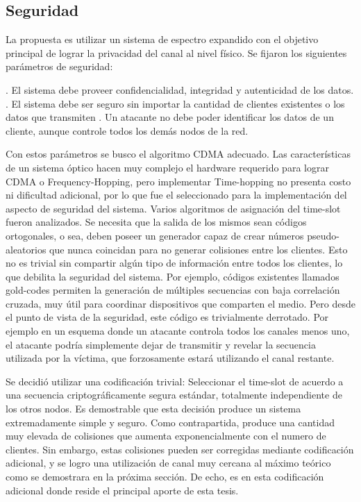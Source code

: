\subsection{Seguridad}
\label{Seguridad}
La propuesta es utilizar un sistema de espectro expandido con el objetivo principal de lograr la privacidad del canal al nivel físico.
Se fijaron los siguientes parámetros de seguridad:

. El sistema debe proveer confidencialidad, integridad y autenticidad de los datos.
. El sistema debe ser seguro sin importar la cantidad de clientes existentes o los datos que transmiten
. Un atacante no debe poder identificar los datos de un cliente, aunque controle todos los demás nodos de la red.

Con estos parámetros se busco el algoritmo CDMA adecuado. Las características de un sistema óptico hacen muy complejo el hardware requerido para lograr CDMA o Frequency-Hopping, pero implementar Time-hopping no presenta costo ni dificultad adicional, por lo que fue el seleccionado para la implementación del aspecto de seguridad del sistema.
Varios algoritmos de asignación del time-slot fueron analizados. Se necesita que la salida de los mismos sean códigos ortogonales, o sea, deben poseer un generador capaz de crear números pseudo-aleatorios que nunca coincidan para no generar colisiones entre los clientes. Esto no es trivial sin compartir algún tipo de información entre todos los clientes, lo que debilita la seguridad del sistema. Por ejemplo, códigos existentes llamados gold-codes permiten la generación de múltiples secuencias con baja correlación cruzada, muy útil para coordinar dispositivos que comparten el medio. Pero desde el punto de vista de la seguridad, este código es trivialmente derrotado. Por ejemplo en un esquema donde un atacante controla todos los canales menos uno, el atacante podría simplemente dejar de transmitir y revelar la secuencia utilizada por la víctima, que forzosamente estará utilizando el canal restante.

Se decidió utilizar una codificación trivial: Seleccionar el time-slot de acuerdo a una secuencia criptográficamente segura estándar, totalmente independiente de los otros nodos. Es demostrable que esta decisión produce un sistema extremadamente simple y seguro. Como contrapartida, produce una cantidad muy elevada de colisiones que aumenta exponencialmente con el numero de clientes. Sin embargo, estas colisiones pueden ser corregidas mediante codificación adicional, y se logro una utilización de canal muy cercana al máximo teórico como se demostrara en la próxima sección. De echo, es en esta codificación adicional donde reside el principal aporte de esta tesis.

